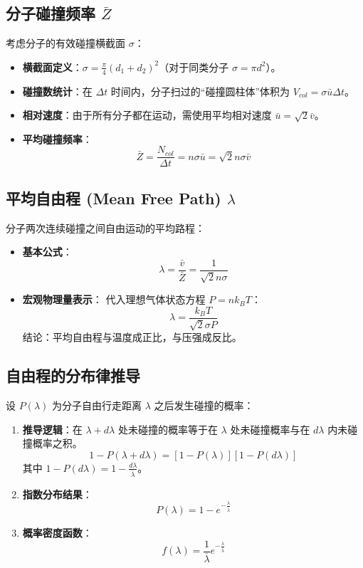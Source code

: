 \documentclass{article}
\begin{document}
\subsection{分子碰撞频率 $\bar{Z}$}
考虑分子的有效碰撞横截面 $\sigma$：
\begin{itemize}
    \item \textbf{横截面定义}：$\sigma = \frac{\pi}{4}(d_1 + d_2)^2$（对于同类分子 $\sigma = \pi d^2$）。
    \item \textbf{碰撞数统计}：在 $\Delta t$ 时间内，分子扫过的“碰撞圆柱体”体积为 $V_{col} = \sigma \bar{u} \Delta t$。
    \item \textbf{相对速度}：由于所有分子都在运动，需使用平均相对速度 $\bar{u} = \sqrt{2} \bar{v}$。
    \item \textbf{平均碰撞频率}：
    \[ \bar{Z} = \frac{N_{col}}{\Delta t} = n \sigma \bar{u} = \sqrt{2} n \sigma \bar{v} \]
\end{itemize}

\subsection{平均自由程 (Mean Free Path) $\lambda$}
分子两次连续碰撞之间自由运动的平均路程：
\begin{itemize}
    \item \textbf{基本公式}：
    \[ \lambda = \frac{\bar{v}}{\bar{Z}} = \frac{1}{\sqrt{2} n \sigma} \]
    \item \textbf{宏观物理量表示}：
    代入理想气体状态方程 $P = n k_B T$：
    \[ \lambda = \frac{k_B T}{\sqrt{2} \sigma P} \]
    结论：平均自由程与温度成正比，与压强成反比。
\end{itemize}

\subsection{自由程的分布律推导}
设 $P(\lambda)$ 为分子自由行走距离 $\lambda$ 之后发生碰撞的概率：
\begin{enumerate}
    \item \textbf{推导逻辑}：在 $\lambda + d\lambda$ 处未碰撞的概率等于在 $\lambda$ 处未碰撞概率与在 $d\lambda$ 内未碰撞概率之积。
    \[ 1 - P(\lambda + d\lambda) = [1 - P(\lambda)] [1 - P(d\lambda)] \]
    其中 $1 - P(d\lambda) = 1 - \frac{d\lambda}{\bar{\lambda}}$。
    \item \textbf{指数分布结果}：
    \[ P(\lambda) = 1 - e^{-\frac{\lambda}{\bar{\lambda}}} \]
    \item \textbf{概率密度函数}：
    \[ f(\lambda) = \frac{1}{\bar{\lambda}} e^{-\frac{\lambda}{\bar{\lambda}}} \]
\end{enumerate}
\end{document}
